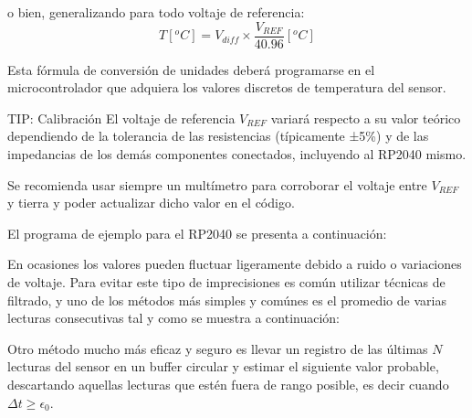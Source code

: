 \noindent o bien, generalizando para todo voltaje de referencia:
\begin{equation*}
	T[^{o}C] = V_{diff} \times \frac{V_{REF}}{ 40.96 }[^{o}C]
\end{equation*}

Esta fórmula de conversión de unidades deberá programarse en el microcontrolador que adquiera los valores discretos de temperatura del sensor.

\medskip
\begin{greenbox}{\large TIP: Calibración}
	El voltaje de referencia $V_{REF}$ variará respecto a su valor teórico dependiendo de la tolerancia de las resistencias (típicamente ±5\%) y de las impedancias de los demás componentes conectados, incluyendo al RP2040 mismo.

	\smallskip

	Se recomienda usar siempre un multímetro para corroborar el voltaje entre $V_{REF}$ y tierra y poder actualizar dicho valor en el código.\footnotemark%
\end{greenbox}
\medskip

El programa de ejemplo para el RP2040\footnotemark{} se presenta a continuación:

\begin{minipage}{\linewidth}

\end{minipage}


En ocasiones los valores pueden fluctuar ligeramente debido a ruido o variaciones de voltaje.
Para evitar este tipo de imprecisiones es común utilizar técnicas de filtrado, y uno de los métodos más simples y comúnes es el promedio de varias lecturas consecutivas tal y como se muestra a continuación:

\begin{minipage}{\linewidth}

\end{minipage}

Otro método mucho más eficaz y seguro es llevar un registro de las últimas $N$ lecturas del sensor en un buffer circular y estimar el siguiente valor probable, descartando aquellas lecturas que estén fuera de rango posible, es decir cuando $\Delta{}t \geq \epsilon{}_0$.

\VerbatimFootnotes{}
